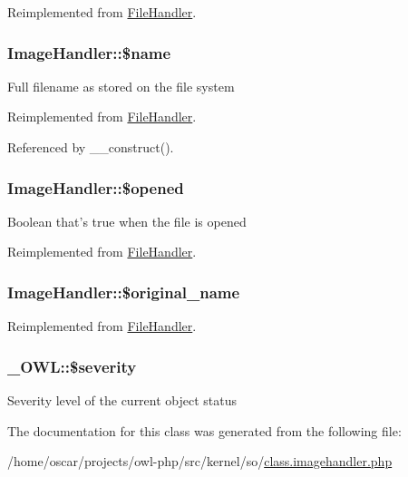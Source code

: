 Reimplemented from \hyperlink{classFileHandler_aa0aa66fd3ad551b3f508b901a95c0c2d}{FileHandler}.

\subsubsection[{\$name}]{\setlength{\rightskip}{0pt plus 5cm}ImageHandler::\$name}\label{classImageHandler_a517b3d7ff8643cca1dc2080523bfe2d6}
Full filename as stored on the file system 

Reimplemented from \hyperlink{classFileHandler_a94903bd51b241928ed415ad271c38805}{FileHandler}.



Referenced by \_\-\_\-construct().

\subsubsection[{\$opened}]{\setlength{\rightskip}{0pt plus 5cm}ImageHandler::\$opened}\label{classImageHandler_a6a87b3626bd0a457c6937b3e9b1cc69b}
Boolean that's true when the file is opened 

Reimplemented from \hyperlink{classFileHandler_a061409b2bbd2e13bc47415527c0de720}{FileHandler}.

\subsubsection[{\$original\_\-name}]{\setlength{\rightskip}{0pt plus 5cm}ImageHandler::\$original\_\-name}\label{classImageHandler_a1712c9444d65879aab111260767afaab}


Reimplemented from \hyperlink{classFileHandler_a477708585850c3c8725ccf56bfe0b4a8}{FileHandler}.

\subsubsection[{\$severity}]{\setlength{\rightskip}{0pt plus 5cm}\_\-OWL::\$severity}\label{class__OWL_ad26b40a9dbbacb33e299b17826f8327c}
Severity level of the current object status 

The documentation for this class was generated from the following file:\begin{DoxyCompactItemize}
\item 
/home/oscar/projects/owl-\/php/src/kernel/so/\hyperlink{class_8imagehandler_8php}{class.imagehandler.php}\end{DoxyCompactItemize}
